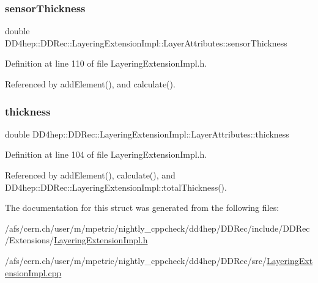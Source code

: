 \subsubsection{\texorpdfstring{sensor\+Thickness}{sensorThickness}}
{\footnotesize\ttfamily double D\+D4hep\+::\+D\+D\+Rec\+::\+Layering\+Extension\+Impl\+::\+Layer\+Attributes\+::sensor\+Thickness}



Definition at line 110 of file Layering\+Extension\+Impl.\+h.



Referenced by add\+Element(), and calculate().

\hypertarget{struct_d_d4hep_1_1_d_d_rec_1_1_layering_extension_impl_1_1_layer_attributes_a5c913b79fd8fba9c943fc7b10097663b}{}\label{struct_d_d4hep_1_1_d_d_rec_1_1_layering_extension_impl_1_1_layer_attributes_a5c913b79fd8fba9c943fc7b10097663b} 
\subsubsection{\texorpdfstring{thickness}{thickness}}
{\footnotesize\ttfamily double D\+D4hep\+::\+D\+D\+Rec\+::\+Layering\+Extension\+Impl\+::\+Layer\+Attributes\+::thickness}



Definition at line 104 of file Layering\+Extension\+Impl.\+h.



Referenced by add\+Element(), calculate(), and D\+D4hep\+::\+D\+D\+Rec\+::\+Layering\+Extension\+Impl\+::total\+Thickness().



The documentation for this struct was generated from the following files\+:\begin{DoxyCompactItemize}
\item 
/afs/cern.\+ch/user/m/mpetric/nightly\+\_\+cppcheck/dd4hep/\+D\+D\+Rec/include/\+D\+D\+Rec/\+Extensions/\hyperlink{_layering_extension_impl_8h}{Layering\+Extension\+Impl.\+h}\item 
/afs/cern.\+ch/user/m/mpetric/nightly\+\_\+cppcheck/dd4hep/\+D\+D\+Rec/src/\hyperlink{_layering_extension_impl_8cpp}{Layering\+Extension\+Impl.\+cpp}\end{DoxyCompactItemize}
